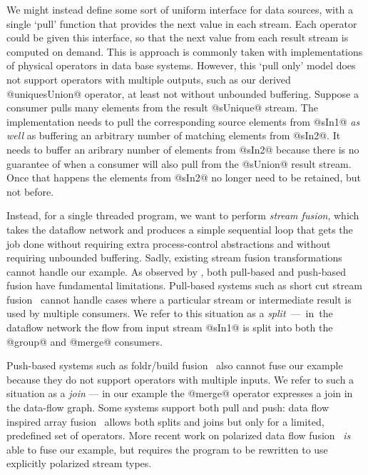 We might instead define some sort of uniform interface for data sources, with a single `pull' function that provides the next value in each stream. Each operator could be given this interface, so that the next value from each result stream is computed on demand. This is approach is commonly taken with implementations of physical operators in data base systems. However, this `pull only' model does not support operators with multiple outputs, such as our derived @uniquesUnion@ operator, at least not without unbounded buffering. Suppose a consumer pulls many elements from the result @sUnique@ stream. The implementation needs to pull the corresponding source elements from @sIn1@ \emph{as well} as buffering an arbitrary number of matching elements from @sIn2@. It needs to buffer an aribrary number of elements from @sIn2@ because there is no guarantee of when a consumer will also pull from the @sUnion@ result stream. Once that happens the elements from @sIn2@ no longer need to be retained, but not before.

Instead, for a single threaded program, we want to perform \emph{stream fusion}, which takes the dataflow network and produces a simple sequential loop that gets the job done without requiring extra process-control abstractions and without requiring unbounded buffering. Sadly, existing stream fusion transformations cannot handle our example. As observed by \citet{kay2009you}, both pull-based and push-based fusion have fundamental limitations. Pull-based systems such as short cut stream fusion~\cite{coutts2007stream} cannot handle cases where a particular stream or intermediate result is used by multiple consumers. We refer to this situation as a \mbox{\emph{split} --- in the} dataflow network the flow from input stream @sIn1@ is split into both the @group@ and @merge@ consumers. 


Push-based systems such as foldr/build fusion~\cite{gill1993short} also cannot fuse our example because they do not support operators with multiple inputs. We refer to such a situation as a \emph{join} --- in our example the @merge@ operator expresses a join in the data-flow graph. Some systems support both pull and push: data flow inspired array fusion~\cite{lippmeier2013data} allows both splits and joins but only for a limited, predefined set of operators. More recent work on polarized data flow fusion~\cite{lippmeier2016polarized} \emph{is} able to fuse our example, but requires the program to be rewritten to use explicitly polarized stream types. 

